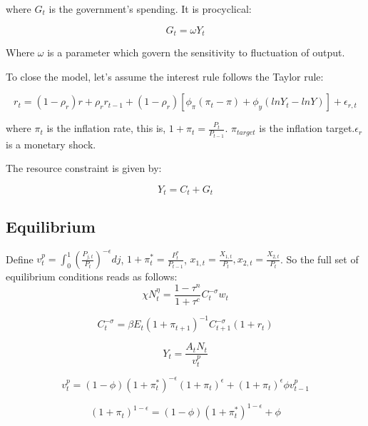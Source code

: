 \documentclass[10pt,math=newtx,citestyle=gb7714-2015,bibstyle=gb7714-2015]{elegantbook}
\begin{document}
{	where $G_t$ is the government's spending. It is procyclical:
	
	\begin{equation}
		G_t=\omega Y_t
	\end{equation}
	
	Where $\omega$ is a parameter which govern the sensitivity to fluctuation of output.
	
	To close the model, let's assume the interest rule follows the Taylor rule:
	
	\begin{equation}
		r_t=(1-\rho_r)r+\rho_r r_{t-1}+(1-\rho_r)\left[\phi_{\pi}(\pi_t-\pi)+\phi_y\left(lnY_t-lnY\right)\right]+\epsilon_{r,t}
	\end{equation}
	
	where $\pi_t$ is the inflation rate, this is, $1+\pi_t=\frac{P_t}{P_{t-1}}$. $\pi_{target}$ is the inflation target.$\epsilon_r$ is a monetary shock.
	
	The resource constraint is given by:
	
	\begin{equation}
		Y_t=C_t+G_t
	\end{equation}
	
	\subsection{Equilibrium}
	
	Define $v_t^p=\int_0^1\left(\frac{P_{j,t}}{P_t}\right)^{-\epsilon}dj$, $1+\pi_t^{*}=\frac{P_t^{*}}{P_{t-1}}$, $x_{1,t}=\frac{X_{1,t}}{P_t}, x_{2,t}=\frac{X_{2,t}}{P_t}$. So the full set of equilibrium conditions reads as follows:
	\begin{equation}
		\chi N_t^{\eta}=\frac{1-\tau^n}{1+\tau^c}C_t^{-\sigma}w_t
	\end{equation}
	
	\begin{equation}
		C_t^{-\sigma}=\beta E_t(1+\pi_{t+1})^{-1}C_{t+1}^{-\sigma}(1+r_t)
	\end{equation}
	
	\begin{equation}
		Y_t=\frac{A_tN_t}{v_t^p}
	\end{equation}
	
	\begin{equation}
		v_t^p=(1-\phi)(1+\pi_t^{*})^{-\epsilon}(1+\pi_t)^{\epsilon}+(1+\pi_t)^{\epsilon}\phi v_{t-1}^p
	\end{equation}
	
	\begin{equation}
		(1+\pi_t)^{1-\epsilon}=(1-\phi)(1+\pi_t^{*})^{1-\epsilon}+\phi
	\end{equation}
	
}
\end{document}
